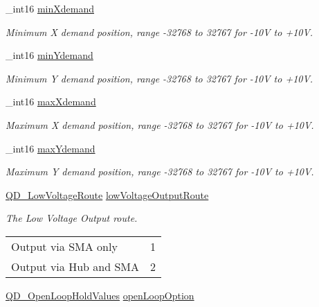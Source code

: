 \begin{DoxyCompactItemize}
\item 
\+\_\+int16 \hyperlink{struct_q_d___position_demand_parameters_aff941bd8c1bd12034c19a2991fc7be54}{min\+Xdemand}
\begin{DoxyCompactList}\small\item\em Minimum X demand position, range -\/32768 to 32767 for -\/10V to +10V. \end{DoxyCompactList}\item 
\+\_\+int16 \hyperlink{struct_q_d___position_demand_parameters_a9fc6a17b0a4d60e8f6cb0cfe1342f083}{min\+Ydemand}
\begin{DoxyCompactList}\small\item\em Minimum Y demand position, range -\/32768 to 32767 for -\/10V to +10V. \end{DoxyCompactList}\item 
\+\_\+int16 \hyperlink{struct_q_d___position_demand_parameters_a3c02bf39a07af94aa9766c7c15c87a2c}{max\+Xdemand}
\begin{DoxyCompactList}\small\item\em Maximum X demand position, range -\/32768 to 32767 for -\/10V to +10V. \end{DoxyCompactList}\item 
\+\_\+int16 \hyperlink{struct_q_d___position_demand_parameters_ad314407b08bb95670889056d5a58ab55}{max\+Ydemand}
\begin{DoxyCompactList}\small\item\em Maximum Y demand position, range -\/32768 to 32767 for -\/10V to +10V. \end{DoxyCompactList}\item 
\hyperlink{group___t_cube_quad_gac883e8fbad1f829af985c3a4fd2e566d}{Q\+D\+\_\+\+Low\+Voltage\+Route} \hyperlink{struct_q_d___position_demand_parameters_a58ceb02e61a3d4ebfa168026b7b11585}{low\+Voltage\+Output\+Route}
\begin{DoxyCompactList}\small\item\em The Low Voltage Output route. \tabulinesep=1mm
\begin{longtabu} spread 0pt [c]{*2{|X[-1]}|}
\hline
Output via S\+MA only&1 \\
Output via Hub and S\+MA&2 \\
\end{longtabu}
\end{DoxyCompactList}\item 
\hyperlink{group___t_cube_quad_ga499dfc94972cba399344f62c70cd37ff}{Q\+D\+\_\+\+Open\+Loop\+Hold\+Values} \hyperlink{struct_q_d___position_demand_parameters_ab15b99977db68066375cccee8df79a5c}{open\+Loop\+Option}

\end{DoxyCompactItemize}
